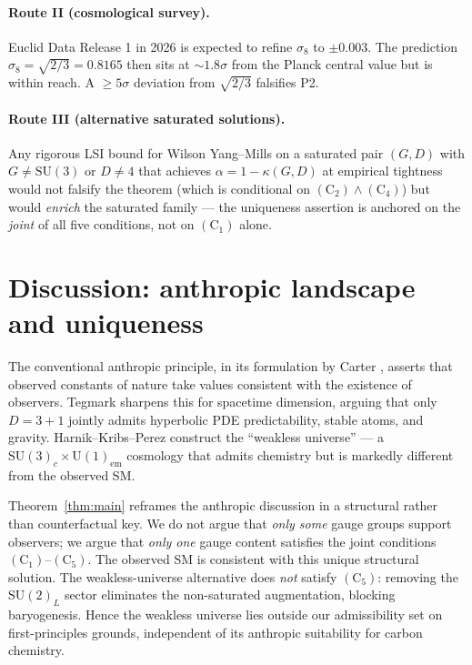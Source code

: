 \documentclass[11pt,reqno]{amsart}
\theoremstyle{plain}
\theoremstyle{definition}
\theoremstyle{remark}
\newcommand{\SU}{\mathrm{SU}}
\newcommand{\Cone}{(\mathrm{C}_1)}
\newcommand{\Ctwo}{(\mathrm{C}_2)}
\newcommand{\Cfour}{(\mathrm{C}_4)}
\newcommand{\Cfive}{(\mathrm{C}_5)}
\begin{document}
\paragraph{Route II (cosmological survey).}
Euclid Data Release 1 in 2026 is expected to refine $\sigma_8$ to $\pm 0.003$. The prediction $\sigma_8 = \sqrt{2/3} = 0.8165$ then sits at $\sim 1.8\sigma$ from the Planck central value but is within reach. A $\ge 5\sigma$ deviation from $\sqrt{2/3}$ falsifies P2.

\paragraph{Route III (alternative saturated solutions).}
Any rigorous LSI bound for Wilson Yang--Mills on a saturated pair $(G, D)$ with $G \ne \SU(3)$ or $D \ne 4$ that achieves $\alpha = 1 - \kappa(G, D)$ at empirical tightness would not falsify the theorem (which is conditional on $\Ctwo \wedge \Cfour$) but would \emph{enrich} the saturated family --- the uniqueness assertion is anchored on the \emph{joint} of all five conditions, not on $\Cone$ alone.

\section{Discussion: anthropic landscape and uniqueness}
\label{sec:anthropic}

The conventional anthropic principle, in its formulation by Carter \cite{Carter1974, Carter2006}, asserts that observed constants of nature take values consistent with the existence of observers. Tegmark \cite{Tegmark1997} sharpens this for spacetime dimension, arguing that only $D = 3 + 1$ jointly admits hyperbolic PDE predictability, stable atoms, and gravity. Harnik--Kribs--Perez \cite{HarnikKribsPerez2006} construct the ``weakless universe'' --- a $\SU(3)_c \times \mathrm{U}(1)_{\mathrm{em}}$ cosmology that admits chemistry but is markedly different from the observed SM.

Theorem~\ref{thm:main} reframes the anthropic discussion in a structural rather than counterfactual key. We do not argue that \emph{only some} gauge groups support observers; we argue that \emph{only one} gauge content satisfies the joint conditions $\Cone$--$\Cfive$. The observed SM is consistent with this unique structural solution. The weakless-universe alternative \cite{HarnikKribsPerez2006} does \emph{not} satisfy $\Cfive$: removing the $\SU(2)_L$ sector eliminates the non-saturated augmentation, blocking baryogenesis. Hence the weakless universe lies outside our admissibility set on first-principles grounds, independent of its anthropic suitability for carbon chemistry.
\end{document}
